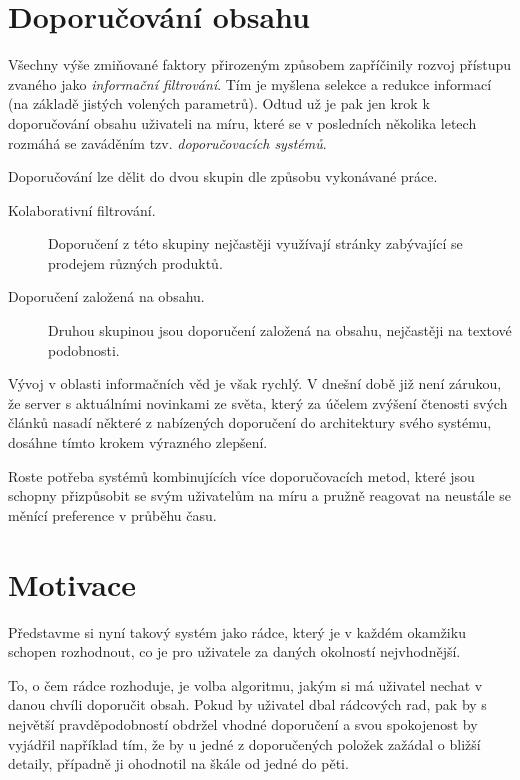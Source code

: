 \documentclass[thesis=M,czech]{FITthesis}[2014/05/07]
\begin{document}
\begin{introduction}
\section{Doporučování obsahu}
\label{sub:recsys}
	Všechny výše zmiňované faktory přirozeným způsobem zapříčinily rozvoj přístupu zvaného jako \emph{informační filtrování}. Tím je myšlena selekce a redukce informací (na základě jistých volených parametrů). Odtud už je pak jen krok k doporučování obsahu uživateli na míru, které se v posledních několika letech rozmáhá se zaváděním tzv. \emph{doporučovacích systémů}.

Doporučování lze dělit do dvou skupin dle způsobu vykonávané práce. 

\begin{description}
	\item[Kolaborativní filtrování.] Doporučení z této skupiny nejčastěji využívají stránky zabývající se prodejem různých produktů.
	
	\item[Doporučení založená na obsahu.] Druhou skupinou jsou doporučení založená na obsahu, nejčastěji na textové podobnosti.
\end{description}

	Vývoj v oblasti informačních věd je však rychlý. V dnešní době již není zárukou, že server s aktuálními novinkami ze světa, který za účelem zvýšení čtenosti svých článků nasadí některé z nabízených doporučení do architektury svého systému, dosáhne tímto krokem výrazného zlepšení.
	
	Roste potřeba systémů kombinujících více doporučovacích metod, které jsou schopny přizpůsobit se svým uživatelům na míru a pružně reagovat na neustále se měnící preference v průběhu času. 

\section{Motivace} 	
\label{sec:motivation}

	Představme si nyní takový systém jako rádce, který je v každém okamžiku schopen rozhodnout, co je pro uživatele za daných okolností nejvhodnější.
	
	To, o čem rádce rozhoduje, je volba algoritmu, jakým si má uživatel nechat v danou chvíli doporučit obsah. Pokud by uživatel dbal rádcových rad, pak by s největší pravděpodobností obdržel vhodné doporučení a svou spokojenost by vyjádřil například tím, že by u jedné z doporučených položek zažádal o bližší detaily, případně ji ohodnotil na škále od jedné do pěti.
	

\end{introduction}
\end{document}
